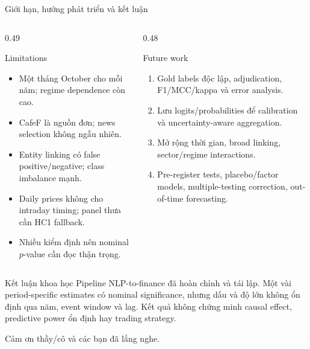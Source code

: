 \documentclass[10pt,aspectratio=169]{beamer}
\begin{document}
\begin{frame}{Giới hạn, hướng phát triển và kết luận}
\begin{columns}[T,onlytextwidth]
\begin{column}{0.49\textwidth}
\begin{block}{Limitations}
\small
\begin{itemize}
\item Một tháng October cho mỗi năm; regime dependence còn cao.
\item CafeF là nguồn đơn; news selection không ngẫu nhiên.
\item Entity linking có false positive/negative; class imbalance mạnh.
\item Daily prices không cho intraday timing; panel thưa cần HC1 fallback.
\item Nhiều kiểm định nên nominal $p$-value cần đọc thận trọng.
\end{itemize}
\end{block}
\end{column}
\begin{column}{0.48\textwidth}
\begin{block}{Future work}
\small
\begin{enumerate}
\item Gold labels độc lập, adjudication, F1/MCC/kappa và error analysis.
\item Lưu logits/probabilities để calibration và uncertainty-aware aggregation.
\item Mở rộng thời gian, broad linking, sector/regime interactions.
\item Pre-register tests, placebo/factor models, multiple-testing correction, out-of-time forecasting.
\end{enumerate}
\end{block}
\end{column}
\end{columns}
\vspace{0.06cm}
\begin{alertblock}{Kết luận khoa học}
\small Pipeline NLP-to-finance đã hoàn chỉnh và tái lập. Một vài period-specific estimates có nominal significance, nhưng dấu và độ lớn không ổn định qua năm, event window và lag. Kết quả không chứng minh causal effect, predictive power ổn định hay trading strategy.
\end{alertblock}
\vfill\centering\Large\textcolor{FinBlue}{Cảm ơn thầy/cô và các bạn đã lắng nghe.}
\end{frame}
\end{document}

